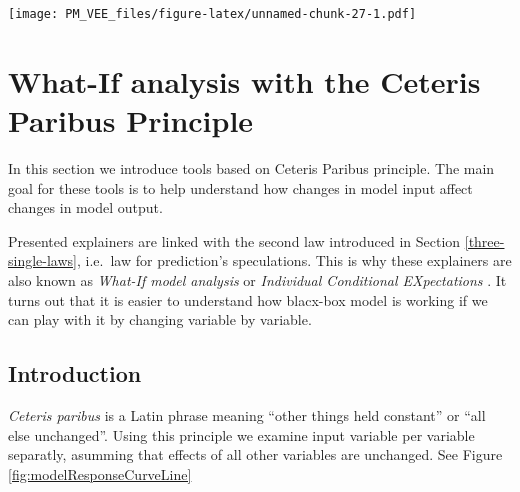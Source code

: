 \documentclass[]{krantz}
\theoremstyle{definition}
\theoremstyle{definition}
\theoremstyle{definition}
\theoremstyle{remark}
\begin{document}
\texttt{[image: PM\_VEE\_files/figure-latex/unnamed-chunk-27-1.pdf]}

\hypertarget{ceterisParibus}{%
\section{What-If analysis with the Ceteris Paribus
Principle}\label{ceterisParibus}}

In this section we introduce tools based on Ceteris Paribus principle.
The main goal for these tools is to help understand how changes in model
input affect changes in model output.

Presented explainers are linked with the second law introduced in
Section \ref{three-single-laws}, i.e.~law for prediction's speculations.
This is why these explainers are also known as \emph{What-If model
analysis} or \emph{Individual Conditional EXpectations} \citep{ICEbox}.
It turns out that it is easier to understand how blacx-box model is
working if we can play with it by changing variable by variable.

\hypertarget{introduction-2}{%
\subsection{Introduction}\label{introduction-2}}

\emph{Ceteris paribus} is a Latin phrase meaning ``other things held
constant'' or ``all else unchanged''. Using this principle we examine
input variable per variable separatly, asumming that effects of all
other variables are unchanged. See Figure
\ref{fig:modelResponseCurveLine}
\end{document}
